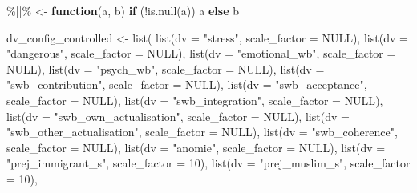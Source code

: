 \documentclass[
  letterpaper,
  DIV=11,
  numbers=noendperiod]{scrreprt}
\newenvironment{Shaded}{\begin{snugshade}}{\end{snugshade}}
\newcommand{\AttributeTok}[1]{\textcolor[rgb]{0.40,0.45,0.13}{#1}}
\newcommand{\ConstantTok}[1]{\textcolor[rgb]{0.56,0.35,0.01}{#1}}
\newcommand{\ControlFlowTok}[1]{\textcolor[rgb]{0.00,0.23,0.31}{\textbf{#1}}}
\newcommand{\DecValTok}[1]{\textcolor[rgb]{0.68,0.00,0.00}{#1}}
\newcommand{\FunctionTok}[1]{\textcolor[rgb]{0.28,0.35,0.67}{#1}}
\newcommand{\NormalTok}[1]{\textcolor[rgb]{0.00,0.23,0.31}{#1}}
\newcommand{\OtherTok}[1]{\textcolor[rgb]{0.00,0.23,0.31}{#1}}
\newcommand{\SpecialCharTok}[1]{\textcolor[rgb]{0.37,0.37,0.37}{#1}}
\newcommand{\StringTok}[1]{\textcolor[rgb]{0.13,0.47,0.30}{#1}}
\begin{document}
\begin{Shaded}
\begin{Highlighting}[]
\StringTok{\textasciigrave{}}\AttributeTok{\%||\%}\StringTok{\textasciigrave{}} \OtherTok{\textless{}{-}} \ControlFlowTok{function}\NormalTok{(a, b) }\ControlFlowTok{if}\NormalTok{ (}\SpecialCharTok{!}\FunctionTok{is.null}\NormalTok{(a)) a }\ControlFlowTok{else}\NormalTok{ b}

\NormalTok{dv\_config\_controlled }\OtherTok{\textless{}{-}} \FunctionTok{list}\NormalTok{(}
  \FunctionTok{list}\NormalTok{(}\AttributeTok{dv =} \StringTok{"stress"}\NormalTok{,                  }\AttributeTok{scale\_factor =} \ConstantTok{NULL}\NormalTok{),}
  \FunctionTok{list}\NormalTok{(}\AttributeTok{dv =} \StringTok{"dangerous"}\NormalTok{,               }\AttributeTok{scale\_factor =} \ConstantTok{NULL}\NormalTok{),}
  \FunctionTok{list}\NormalTok{(}\AttributeTok{dv =} \StringTok{"emotional\_wb"}\NormalTok{,            }\AttributeTok{scale\_factor =} \ConstantTok{NULL}\NormalTok{),}
  \FunctionTok{list}\NormalTok{(}\AttributeTok{dv =} \StringTok{"psych\_wb"}\NormalTok{,                }\AttributeTok{scale\_factor =} \ConstantTok{NULL}\NormalTok{),}
  \FunctionTok{list}\NormalTok{(}\AttributeTok{dv =} \StringTok{"swb\_contribution"}\NormalTok{,        }\AttributeTok{scale\_factor =} \ConstantTok{NULL}\NormalTok{),}
  \FunctionTok{list}\NormalTok{(}\AttributeTok{dv =} \StringTok{"swb\_acceptance"}\NormalTok{,          }\AttributeTok{scale\_factor =} \ConstantTok{NULL}\NormalTok{),}
  \FunctionTok{list}\NormalTok{(}\AttributeTok{dv =} \StringTok{"swb\_integration"}\NormalTok{,         }\AttributeTok{scale\_factor =} \ConstantTok{NULL}\NormalTok{),}
  \FunctionTok{list}\NormalTok{(}\AttributeTok{dv =} \StringTok{"swb\_own\_actualisation"}\NormalTok{,   }\AttributeTok{scale\_factor =} \ConstantTok{NULL}\NormalTok{),}
  \FunctionTok{list}\NormalTok{(}\AttributeTok{dv =} \StringTok{"swb\_other\_actualisation"}\NormalTok{, }\AttributeTok{scale\_factor =} \ConstantTok{NULL}\NormalTok{),}
  \FunctionTok{list}\NormalTok{(}\AttributeTok{dv =} \StringTok{"swb\_coherence"}\NormalTok{,           }\AttributeTok{scale\_factor =} \ConstantTok{NULL}\NormalTok{),}
  \FunctionTok{list}\NormalTok{(}\AttributeTok{dv =} \StringTok{"anomie"}\NormalTok{,                  }\AttributeTok{scale\_factor =} \ConstantTok{NULL}\NormalTok{),}
  \FunctionTok{list}\NormalTok{(}\AttributeTok{dv =} \StringTok{"prej\_immigrant\_s"}\NormalTok{,        }\AttributeTok{scale\_factor =} \DecValTok{10}\NormalTok{),}
  \FunctionTok{list}\NormalTok{(}\AttributeTok{dv =} \StringTok{"prej\_muslim\_s"}\NormalTok{,           }\AttributeTok{scale\_factor =} \DecValTok{10}\NormalTok{),}

\end{Highlighting}
\end{Shaded}
\end{document}
